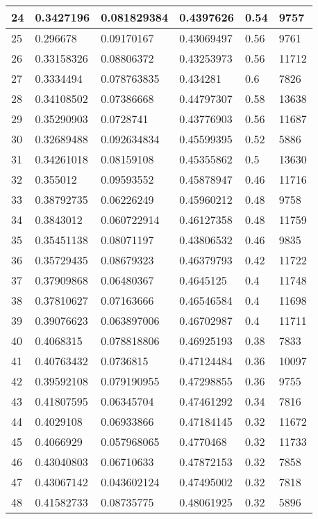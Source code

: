 \begin{longtable}{|l|l|l|l|l|l|}
24 & 0.3427196 & 0.081829384 & 0.4397626 & 0.54 & 9757 \\ \hline 
25 & 0.296678 & 0.09170167 & 0.43069497 & 0.56 & 9761 \\ \hline 
26 & 0.33158326 & 0.08806372 & 0.43253973 & 0.56 & 11712 \\ \hline 
27 & 0.3334494 & 0.078763835 & 0.434281 & 0.6 & 7826 \\ \hline 
28 & 0.34108502 & 0.07386668 & 0.44797307 & 0.58 & 13638 \\ \hline 
29 & 0.35290903 & 0.0728741 & 0.43776903 & 0.56 & 11687 \\ \hline 
30 & 0.32689488 & 0.092634834 & 0.45599395 & 0.52 & 5886 \\ \hline 
31 & 0.34261018 & 0.08159108 & 0.45355862 & 0.5 & 13630 \\ \hline 
32 & 0.355012 & 0.09593552 & 0.45878947 & 0.46 & 11716 \\ \hline 
33 & 0.38792735 & 0.06226249 & 0.45960212 & 0.48 & 9758 \\ \hline 
34 & 0.3843012 & 0.060722914 & 0.46127358 & 0.48 & 11759 \\ \hline 
35 & 0.35451138 & 0.08071197 & 0.43806532 & 0.46 & 9835 \\ \hline 
36 & 0.35729435 & 0.08679323 & 0.46379793 & 0.42 & 11722 \\ \hline 
37 & 0.37909868 & 0.06480367 & 0.4645125 & 0.4 & 11748 \\ \hline 
38 & 0.37810627 & 0.07163666 & 0.46546584 & 0.4 & 11698 \\ \hline 
39 & 0.39076623 & 0.063897006 & 0.46702987 & 0.4 & 11711 \\ \hline 
40 & 0.4068315 & 0.078818806 & 0.46925193 & 0.38 & 7833 \\ \hline 
41 & 0.40763432 & 0.0736815 & 0.47124484 & 0.36 & 10097 \\ \hline 
42 & 0.39592108 & 0.079190955 & 0.47298855 & 0.36 & 9755 \\ \hline 
43 & 0.41807595 & 0.06345704 & 0.47461292 & 0.34 & 7816 \\ \hline 
44 & 0.4029108 & 0.06933866 & 0.47184145 & 0.32 & 11672 \\ \hline 
45 & 0.4066929 & 0.057968065 & 0.4770468 & 0.32 & 11733 \\ \hline 
46 & 0.43040803 & 0.06710633 & 0.47872153 & 0.32 & 7858 \\ \hline 
47 & 0.43067142 & 0.043602124 & 0.47495002 & 0.32 & 7818 \\ \hline 
48 & 0.41582733 & 0.08735775 & 0.48061925 & 0.32 & 5896 \\ \hline 

\end{longtable}
